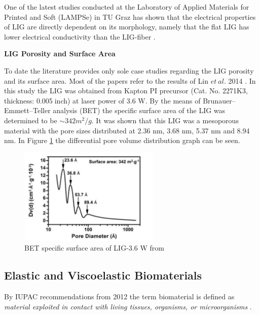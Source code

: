 One of the latest studies conducted at the Laboratory of Applied Materials for Printed and Soft (LAMPSe) in TU Graz has shown that the electrical properties of LIG are directly dependent on its morphology, namely that the flat LIG has lower electrical conductivity than the LIG-fiber \cite{david}. 

\textbf{LIG Porosity and Surface Area}

To date the  literature provides only sole case studies regarding the LIG porosity and its surface area. Most of the papers refer to the results of Lin \textit{$et\ al.$} 2014 \cite{lin_laser-induced_2014}. In this study the LIG was obtained from Kapton PI precursor (Cat. No. 2271K3, thickness: 0.005$\;$inch) at laser power of 3.6 W. By the means of Brunauer–Emmett–Teller analysis (BET) the specific surface area of the LIG was determined to be $\sim 342m^2/g$. It was shown that this LIG was a mesoporous material with the pore sizes distributed at 2.36 nm, 3.68 nm, 5.37 nm and 8.94 nm. In Figure \ref{fig:lin_BET} the differential pore volume distribution graph can be seen. 

\begin{figure}[H]
\centering
\includegraphics[width=0.6\textwidth]{Figures/Results/BET_results_LIN.jpg}
\medskip
\captionsetup{width=0.5\linewidth}
\caption{BET  specific  surface  area  of LIG-3.6  W from  \cite{lin_laser-induced_2014}}
\label{fig:lin_BET}
\end{figure}


\subsection{Elastic and Viscoelastic Biomaterials}

By IUPAC recommendations from 2012 the term biomaterial is defined as \textit{material exploited in contact with living tissues, organisms, or microorganisms}  \cite{TerminologyforbiorelatedpolymersandapplicationsIUPACRecommendations2012}. 

